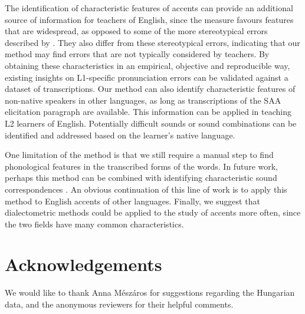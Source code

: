\documentclass[output=paper]{LSP/langsci}
\begin{document}
The identification of characteristic features of accents can provide an additional source of information for teachers of English, since the measure favours features that are widespread, as opposed to some of the more stereotypical errors described by \citet{van_den_doel_evaluation_2006}. They also differ from these stereotypical errors, indicating that our method may find errors that are not typically considered by teachers. By obtaining these characteristics in an empirical, objective and reproducible way, existing insights on L1-specific pronunciation errors can be validated against a dataset of transcriptions. Our method can also identify characteristic features of non-native speakers in other languages, as long as transcriptions of the SAA elicitation paragraph are available. This information can be applied in teaching L2 learners of English. Potentially difficult sounds or sound combinations can be identified and addressed based on the learner's native language.

One limitation of the method is that we still require a manual step to find phonological features in the transcribed forms of the words. In future work, perhaps this method can be combined with identifying characteristic sound correspondences \citep{wieling_bipartite_2011}. An obvious continuation of this line of work is to apply this method to English accents of other languages. Finally, we suggest that dialectometric methods could be applied to the study of accents more often, since the two fields have many common characteristics.

\section*{Acknowledgements}

We would like to thank Anna M\'{e}sz\'{a}ros for suggestions regarding the Hungarian data, and the anonymous reviewers for their helpful comments.


\printbibliography[heading=subbibliography,notkeyword=this]
\end{document}
